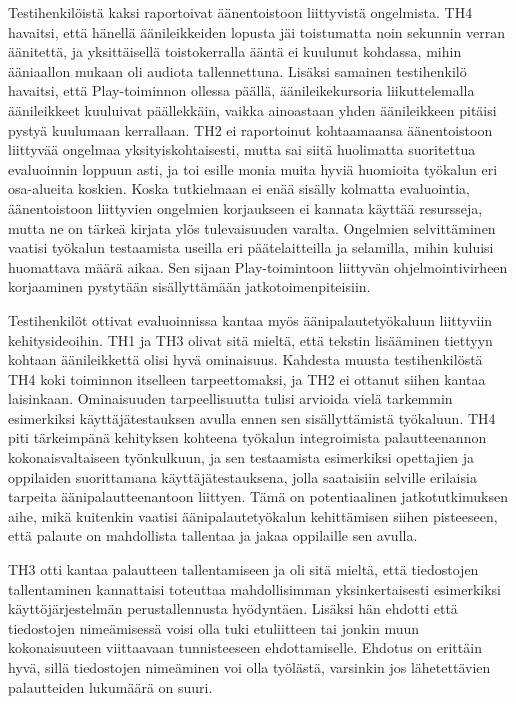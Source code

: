 \documentclass[utf8]{gradu3}
\begin{document}
Testihenkilöistä kaksi raportoivat äänentoistoon liittyvistä ongelmista. TH4 havaitsi, että hänellä äänileikkeiden lopusta jäi toistumatta noin sekunnin verran äänitettä, ja yksittäisellä toistokerralla ääntä ei kuulunut kohdassa, mihin ääniaallon mukaan oli audiota tallennettuna. Lisäksi samainen testihenkilö havaitsi, että Play-toiminnon ollessa päällä, äänileikekursoria liikuttelemalla äänileikkeet kuuluivat päällekkäin, vaikka ainoastaan yhden äänileikkeen pitäisi pystyä kuulumaan kerrallaan. TH2 ei raportoinut kohtaamaansa äänentoistoon liittyvää ongelmaa yksityiskohtaisesti, mutta sai siitä huolimatta suoritettua evaluoinnin loppuun asti, ja toi esille monia muita hyviä huomioita työkalun eri osa-alueita koskien. Koska tutkielmaan ei enää sisälly kolmatta evaluointia, äänentoistoon liittyvien ongelmien korjaukseen ei kannata käyttää resursseja, mutta ne on tärkeä kirjata ylös tulevaisuuden varalta. Ongelmien selvittäminen vaatisi työkalun testaamista useilla eri päätelaitteilla ja selamilla, mihin kuluisi huomattava määrä aikaa. Sen sijaan Play-toimintoon liittyvän ohjelmointivirheen korjaaminen pystytään sisällyttämään jatkotoimenpiteisiin.

Testihenkilöt ottivat evaluoinnissa kantaa myös äänipalautetyökaluun liittyviin kehitysideoihin. TH1 ja TH3 olivat sitä mieltä, että tekstin lisääminen tiettyyn kohtaan äänileikkettä olisi hyvä ominaisuus. Kahdesta muusta testihenkilöstä TH4 koki toiminnon itselleen tarpeettomaksi, ja TH2 ei ottanut siihen kantaa laisinkaan. Ominaisuuden tarpeellisuutta tulisi arvioida vielä tarkemmin esimerkiksi käyttäjätestauksen avulla ennen sen sisällyttämistä työkaluun. TH4 piti tärkeimpänä kehityksen kohteena työkalun integroimista palautteenannon kokonaisvaltaiseen työnkulkuun, ja sen testaamista esimerkiksi opettajien ja oppilaiden suorittamana käyttäjätestauksena, jolla saataisiin selville erilaisia tarpeita äänipalautteenantoon liittyen. Tämä on potentiaalinen jatkotutkimuksen aihe, mikä kuitenkin vaatisi äänipalautetyökalun kehittämisen siihen pisteeseen, että palaute on mahdollista tallentaa ja jakaa oppilaille sen avulla.

TH3 otti kantaa palautteen tallentamiseen ja oli sitä mieltä, että tiedostojen tallentaminen kannattaisi toteuttaa mahdollisimman yksinkertaisesti esimerkiksi käyttöjärjestelmän perustallennusta hyödyntäen. Lisäksi hän ehdotti että tiedostojen nimeämisessä voisi olla tuki etuliitteen tai jonkin muun kokonaisuuteen viittaavaan tunnisteeseen ehdottamiselle. Ehdotus on erittäin hyvä, sillä tiedostojen nimeäminen voi olla työlästä, varsinkin jos lähetettävien palautteiden lukumäärä on suuri.
\end{document}
